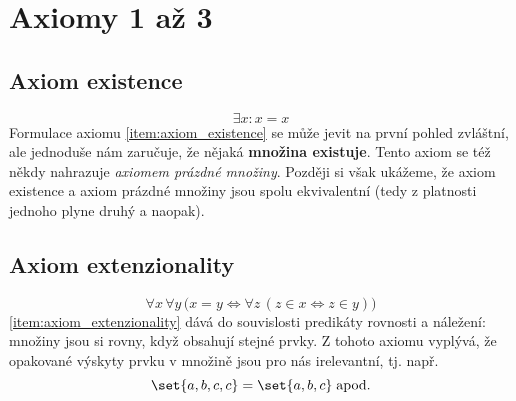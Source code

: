 \section{Axiomy 1 až 3}\label{sec:axiomy_1_az_3}
\subsection{Axiom existence}
\begin{equation*}
    \exists x: x=x
\end{equation*}
Formulace axiomu \ref{item:axiom_existence} se může jevit na první pohled zvláštní, ale jednoduše nám zaručuje, že nějaká \textbf{množina existuje}. Tento axiom se též někdy nahrazuje \emph{axiomem prázdné množiny}. Později si však ukážeme, že axiom existence a axiom prázdné množiny jsou spolu ekvivalentní (tedy z platnosti jednoho plyne druhý a naopak).

\subsection{Axiom extenzionality}
\begin{equation*}
    \forall x\,\forall y\,\bigl(x=y \iff \forall z\,(z\in x \iff z\in y)\bigr)
\end{equation*}
\ref{item:axiom_extenzionality} dává do souvislosti predikáty rovnosti a náležení: množiny jsou si rovny, když obsahují stejné prvky. Z tohoto axiomu vyplývá, že opakované výskyty prvku v množině jsou pro nás irelevantní, tj. např.
\begin{equation*}
    \set{a,b,c,c}=\set{a,b,c}\;\text{apod.}
\end{equation*}

